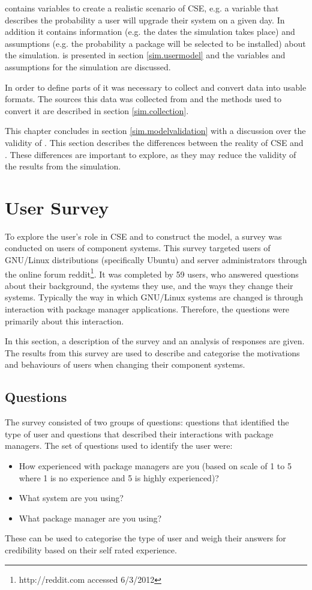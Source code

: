 \usermodel contains variables to create a realistic scenario of CSE, e.g. a variable that describes the probability a user will upgrade their system on a given day.
In addition it contains information (e.g. the dates the simulation takes place) and assumptions (e.g. the probability a package will be selected to be installed) about the simulation.
\usermodel is presented in section \ref{sim.usermodel} and the variables and assumptions for the simulation are discussed.

In order to define parts of \usermodel it was necessary to collect and convert data into usable formats.
The sources this data was collected from and the methods used to convert it are described in section \ref{sim.collection}.

This chapter concludes in section \ref{sim.modelvalidation} with a discussion over the validity of \usermodel.
This section describes the differences between the reality of CSE and \usermodel.
These differences are important to explore, as they may reduce the validity of the results from the simulation.

\section{User Survey}
\label{strat.usersurvey}
To explore the user's role in CSE and to construct the \usermodel model, a survey was conducted on users of component systems.
This survey targeted users of GNU/Linux distributions (specifically Ubuntu) and server administrators through the online forum reddit\footnote{http://reddit.com accessed 6/3/2012}.
It was completed by 59 users, who answered questions about their background, the systems they use, and the ways they change their systems.
Typically the way in which GNU/Linux systems are changed is through interaction with package manager applications. 
Therefore, the questions were primarily about this interaction.

In this section, a description of the survey and an analysis of responses are given.
The results from this survey are used to describe and categorise the motivations and behaviours of users when changing their component systems.

\subsection{Questions}
The survey consisted of two groups of questions: questions that identified the type of user and questions that described their interactions with package managers.
The set of questions used to identify the user were:
\begin{itemize}
  \item How experienced with package managers are you (based on scale of 1 to 5 where 1 is no experience and 5 is highly experienced)? 
  \item What system are you using?
  \item What package manager are you using?
\end{itemize}
These can be used to categorise the type of user and weigh their answers for credibility based on their self rated experience.

